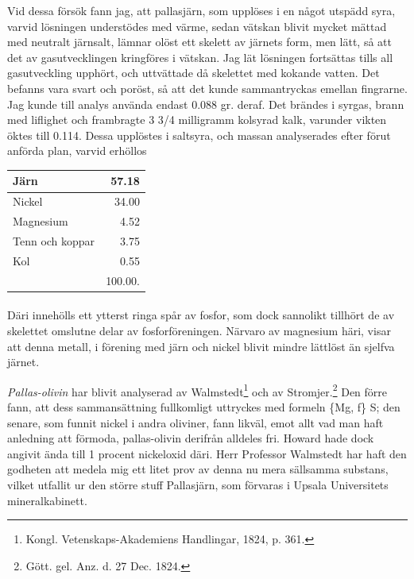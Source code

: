 \documentclass[a4paper, 12pt, oneside, swedish]{article}
\begin{document}
Vid dessa försök fann jag, att pallasjärn, som upplöses i en något utspädd syra, varvid lösningen understödes med värme, sedan vätskan blivit mycket mättad med neutralt järnsalt, lämnar olöst ett skelett av järnets form, men lätt, så att det av gasutvecklingen kringföres i vätskan. Jag lät lösningen fortsättas tills all gasutveckling upphört, och uttvättade då skelettet med kokande vatten. Det befanns vara svart och poröst, så att det kunde sammantryckas emellan fingrarne. Jag kunde till analys använda endast 0.088 gr. deraf. Det brändes i syrgas, brann med liflighet och frambragte 3 3/4 milligramm kolsyrad kalk, varunder vikten öktes till 0.114. Dessa upplöstes i saltsyra, och massan analyserades efter förut anförda plan, varvid erhöllos
\begin{table}[H]
    \centering\small
    \begin{tabular}{|l|r|}
    \hline
        Järn & 57.18 \\ \hline
        Nickel & 34.00 \\ \hline
        Magnesium & 4.52 \\ \hline
        Tenn och koppar & 3.75 \\ \hline
        Kol & 0.55 \\ \hline
        ~ & 100.00. \\ \hline
    \end{tabular}
\end{table}
\paragraph{}
Däri innehölls ett ytterst ringa spår av fosfor, som dock sannolikt tillhört de av skelettet omslutne delar av fosforföreningen. Närvaro av magnesium häri, visar att denna metall, i förening med järn och nickel blivit mindre lättlöst än sjelfva järnet.

\emph{Pallas-olivin} har blivit analyserad av Walmstedt\footnote{Kongl. Vetenskaps-Akademiens Handlingar, 1824, p. 361.} och av Stromjer.\footnote{Gött. gel. Anz. d. 27 Dec. 1824.} Den förre fann, att dess sammansättning fullkomligt uttryckes med formeln \{Mg, ƒ\} S; den senare, som funnit nickel i andra oliviner, fann likväl, emot allt vad man haft anledning att förmoda, pallas-olivin derifrån alldeles fri. Howard hade dock angivit ända till 1 procent nickeloxid däri. Herr Professor Walmstedt har haft den godheten att medela mig ett litet prov av denna nu mera sällsamma substans, vilket utfallit ur den större stuff Pallasjärn, som förvaras i Upsala Universitets mineralkabinett.
\end{document}
